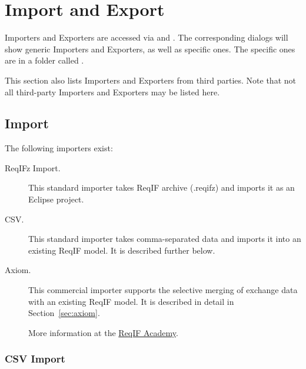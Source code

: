 \section{Import and Export}
\label{sec:import-export}

Importers and Exporters are accessed via  and .  The corresponding dialogs will show generic Importers and Exporters, as well as specific ones.  The specific ones are in a folder called .

This section also lists Importers and Exporters from third parties. Note that not all third-party Importers and Exporters may be listed here.

\subsection{Import}
\label{sec:import}%

The following importers exist:

\begin{description}
\item[ReqIFz Import.] This standard importer takes ReqIF archive (.reqifz) and imports it as an Eclipse project.

\item[CSV.] This standard importer takes comma-separated data and imports it into an existing ReqIF model.  It is described further below.

\item[Axiom.] This commercial importer supports the selective merging of exchange data with an existing ReqIF model.  It is described in detail in Section~\ref{sec:axiom}.

More information at the \href{https://reqif.academy}{ReqIF Academy}.

\end{description}

\subsubsection{CSV Import}
\label{sec:csv-import}

